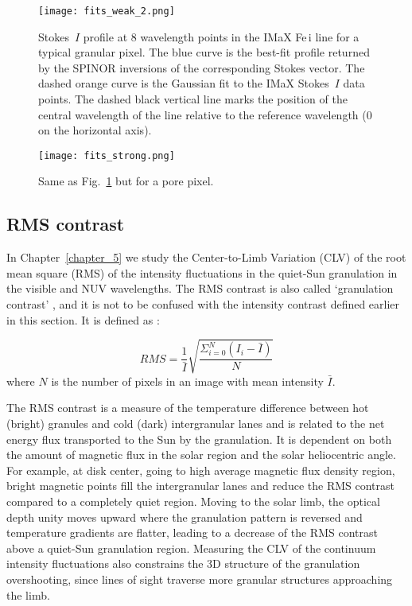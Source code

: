 \documentclass[goettingen, gauss, print]{thesis}
\begin{document}
\begin{figure}
\begin{center}

\hspace*{-1.5cm}\texttt{[image: fits\_weak\_2.png]}
\caption{Stokes~$I$ profile at 8 wavelength points in the IMaX Fe\,{\sc i} line for a typical granular pixel. The blue curve is the best-fit profile returned by the SPINOR inversions of the corresponding Stokes vector. The dashed orange curve is the Gaussian fit to the IMaX Stokes~$I$ data points. The dashed black vertical line marks the position of the central wavelength of the line relative to the reference wavelength ($0$ on the horizontal axis).}
\label{fits_weak}
\end{center}

\end{figure} 

\begin{figure}
\hspace*{-1.5cm}\texttt{[image: fits\_strong.png]}
\caption{Same as Fig.~\ref{fits_weak} but for a pore pixel.}
\label{fits_strong}
\end{figure} 
  
  
  
\newpage

\subsection{RMS contrast}
In Chapter~\ref{chapter_5} we study the Center-to-Limb Variation (CLV) of the root mean square (RMS) of the intensity fluctuations in the quiet-Sun granulation in the visible and NUV wavelengths.
The RMS contrast is also called `granulation contrast' \citep{danilovic_intensity_2008}, and it is not to be confused with the intensity contrast defined earlier in this section. It is defined as \citep[e.g.,][]{abramenko_detection_2012}:

\begin{equation}
RMS = \frac{1}{\bar{I}} \sqrt{ \frac{\Sigma^{N}_{i=0} (I_i - \bar{I})}{N}}
\end{equation} where $N$ is the number of pixels in an image with mean intensity $\bar{I}$.

The RMS contrast is a measure of the temperature difference between hot (bright) granules and cold (dark) intergranular lanes and is related to the net energy flux transported to the Sun by the granulation. It is dependent on both the amount of magnetic flux in the solar region and the solar heliocentric angle. For example, at disk center, going to high average magnetic flux density region, bright magnetic points fill the intergranular lanes and reduce the RMS contrast compared to a completely quiet region. Moving to the solar limb, the optical depth unity moves upward where the granulation pattern is reversed and temperature gradients are flatter, leading to a decrease of the RMS contrast above a quiet-Sun granulation region. Measuring the CLV of the continuum intensity fluctuations also constrains the 3D structure of the granulation overshooting, since lines of sight traverse more granular structures approaching the limb.  
\end{document}
